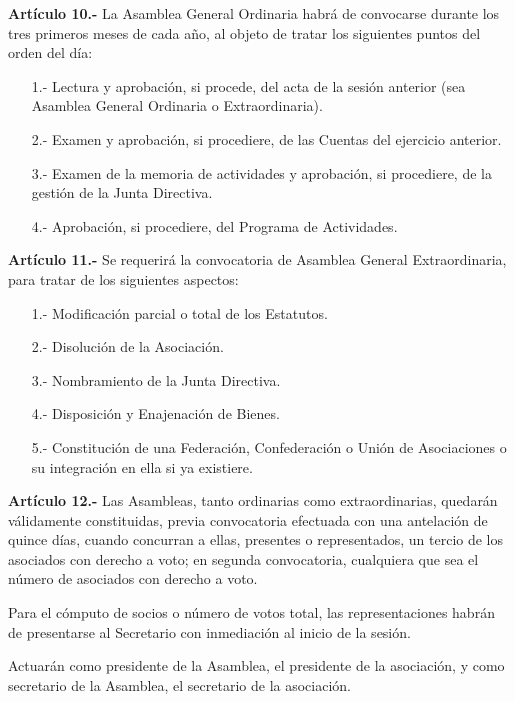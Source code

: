 \documentclass[a4paper,12pt]{article}
\begin{document}
\begin{onehalfspace}
\bigskip\bigskip

\textbf{Art\'iculo 10.-} La Asamblea General Ordinaria habr\'a de convocarse durante los tres primeros meses de cada a\~no, al objeto de tratar los siguientes puntos del orden del d\'ia:
\begin{itemize}
\item [1.-] Lectura y aprobaci\'on, si procede, del acta de la sesi\'on anterior (sea Asamblea General Ordinaria o Extraordinaria).
\item [2.-] Examen y aprobaci\'on, si procediere, de las Cuentas del ejercicio anterior.
\item [3.-] Examen de la memoria de actividades y aprobaci\'on, si procediere, de la gesti\'on de la Junta Directiva.
\item [4.-] Aprobaci\'on, si procediere, del Programa de Actividades.
\end{itemize}

\bigskip\bigskip

\textbf{Art\'iculo 11.-} Se requerir\'a la convocatoria de Asamblea General Extraordinaria, para tratar de los siguientes aspectos:
\begin{itemize}
\item [1.-] Modificaci\'on parcial o total de los Estatutos.
\item [2.-] Disoluci\'on de la Asociaci\'on.
\item [3.-] Nombramiento de la Junta Directiva.
\item [4.-] Disposici\'on y Enajenaci\'on de Bienes.
\item [5.-] Constituci\'on de una Federaci\'on, Confederaci\'on o Uni\'on de Asociaciones o su integraci\'on en ella si ya existiere.
\end{itemize}

\bigskip\bigskip

\textbf{Art\'iculo 12.-} Las Asambleas, tanto ordinarias como extraordinarias, quedar\'an v\'alidamente constituidas, previa convocatoria efectuada con una antelaci\'on de quince d\'ias, cuando concurran a ellas, presentes o representados, un tercio de los asociados con derecho a voto; en segunda convocatoria, cualquiera que sea el n\'umero de asociados con derecho a voto.

Para el c\'omputo de socios o n\'umero de votos total, las representaciones habr\'an de presentarse al Secretario con inmediaci\'on al inicio de la sesi\'on.

Actuar\'an como presidente de la Asamblea, el presidente de la asociaci\'on, y como secretario de la Asamblea, el secretario de la asociaci\'on.


\end{onehalfspace}
\end{document}
